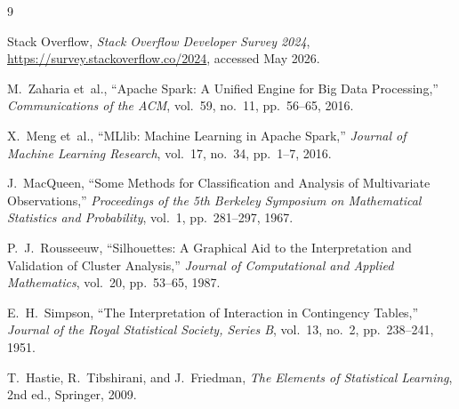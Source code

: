 \documentclass[11pt,a4paper]{article}
\begin{document}
\begin{thebibliography}{9}

Stack Overflow,
\textit{Stack Overflow Developer Survey 2024},
\url{https://survey.stackoverflow.co/2024}, accessed May 2026.

M.~Zaharia et~al.,
``Apache Spark: A Unified Engine for Big Data Processing,''
\textit{Communications of the ACM}, vol.~59, no.~11, pp.~56--65, 2016.

X.~Meng et~al.,
``MLlib: Machine Learning in Apache Spark,''
\textit{Journal of Machine Learning Research}, vol.~17, no.~34, pp.~1--7, 2016.

J.~MacQueen,
``Some Methods for Classification and Analysis of Multivariate Observations,''
\textit{Proceedings of the 5th Berkeley Symposium on Mathematical Statistics
and Probability}, vol.~1, pp.~281--297, 1967.

P.~J.~Rousseeuw,
``Silhouettes: A Graphical Aid to the Interpretation and Validation of
Cluster Analysis,''
\textit{Journal of Computational and Applied Mathematics},
vol.~20, pp.~53--65, 1987.

E.~H.~Simpson,
``The Interpretation of Interaction in Contingency Tables,''
\textit{Journal of the Royal Statistical Society, Series B},
vol.~13, no.~2, pp.~238--241, 1951.

T.~Hastie, R.~Tibshirani, and J.~Friedman,
\textit{The Elements of Statistical Learning}, 2nd ed.,
Springer, 2009.

\end{thebibliography}
\end{document}
